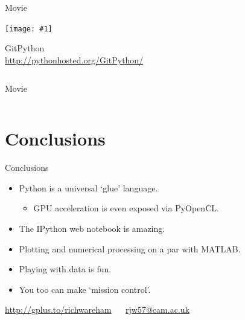 \documentclass[aspectratio=169]{beamer}
\newcommand{\tallimage}[1]{%
  \begin{frame}
    \centering
    \texttt{[image: \#1]}
    \\
  \end{frame}
}
\begin{document}
\begin{frame}
  \inputminted{python}{TrafficData/link_data.py}
\end{frame}

\begin{frame}
  \inputminted{python}{TrafficData/hist.py}
\end{frame}

\begin{frame}
  \centering\Huge
  Movie
  \\
\end{frame}

\tallimage{img/git-repo.png}

\begin{frame}
  \centering\Huge
  GitPython
  \\
  \vspace{\baselineskip}
  \url{http://pythonhosted.org/GitPython/}
  \\
\end{frame}

\begin{frame}
  \inputminted{python}{bng-speed-links.py}
\end{frame}

\begin{frame}
  \centering\Huge
  Movie
  \\
\end{frame}

\begin{frame}
  \inputminted{python}{ephem.py}
\end{frame}

\section{Conclusions}

\begin{frame}{Conclusions}
  \begin{itemize}
    \item Python is a universal `glue' language.
    \begin{itemize}
      \item GPU acceleration is even exposed via PyOpenCL.
    \end{itemize}
    \item The IPython web notebook is amazing.
    \item Plotting and numerical processing on a par with MATLAB.
    \item Playing with data is fun.
    \item You too can make `mission control'.
  \end{itemize}
  \vspace{2\baselineskip}
  \begin{centering}
    \url{http://gplus.to/richwareham} $\quad$ \url{rjw57@cam.ac.uk}\\
  \end{centering}
\end{frame}
\end{document}
